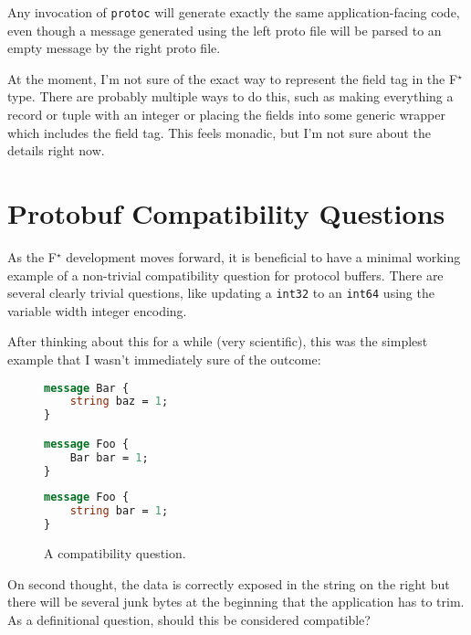 \documentclass[11pt]{article}
\newcommand{\fstar}{F\(^\star\)}
\begin{document}
Any invocation of \texttt{protoc} will generate exactly the same
application-facing code, even though a message generated using the left proto
file will be parsed to an empty message by the right proto file.

At the moment, I'm not sure of the exact way to represent the field tag in the
\fstar{} type. There are probably multiple ways to do this, such as making
everything a record or tuple with an integer or placing the fields into some
generic wrapper which includes the field tag. This feels monadic, but I'm not
sure about the details right now.

\section{Protobuf Compatibility Questions}

As the \fstar{} development moves forward, it is beneficial to have a minimal
working example of a non-trivial compatibility question for protocol
buffers. There are several clearly trivial questions, like updating a
\texttt{int32} to an \texttt{int64} using the variable width integer encoding.

After thinking about this for a while (very scientific), this was the simplest
example that I wasn't immediately sure of the outcome:

\begin{figure}[H]
	\centering
	\begin{minipage}[bt]{0.4\textwidth}
		\begin{lstlisting}[language=proto]
message Bar {
    string baz = 1;
}

message Foo {
    Bar bar = 1;
}\end{lstlisting}
	\end{minipage}
	\hspace{1cm}
	\begin{minipage}[bt]{0.4\textwidth}
		\begin{lstlisting}[language=proto]
message Foo {
    string bar = 1;
}\end{lstlisting}
	\end{minipage}

	\caption[]{A compatibility question.}
\end{figure}

On second thought, the data is correctly exposed in the string on the right but
there will be several junk bytes at the beginning that the application has to
trim. As a definitional question, should this be considered compatible?

\printbibliography{}
\end{document}
